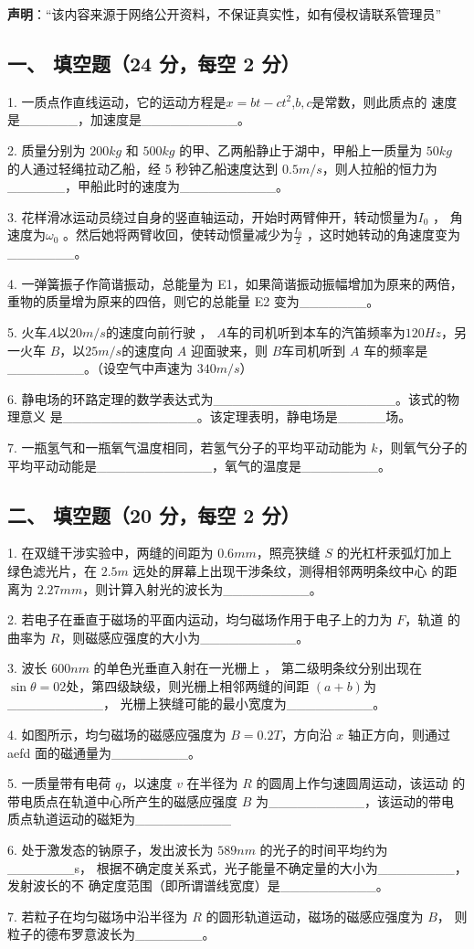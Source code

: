 
\textbf{声明}：“该内容来源于网络公开资料，不保证真实性，如有侵权请联系管理员”

\subsection{一、 填空题（24 分，每空 2 分）}
1. 一质点作直线运动，它的运动方程是$x=bt-ct^2$,$b,c$是常数，则此质点的
速度是______，加速度是__________。

2. 质量分别为 $200kg$ 和 $500kg$ 的甲、乙两船静止于湖中，甲船上一质量为 $50kg$
的人通过轻绳拉动乙船，经 5 秒钟乙船速度达到 $0.5m/s$，则人拉船的恒力为
______，甲船此时的速度为__________。

3. 花样滑冰运动员绕过自身的竖直轴运动，开始时两臂伸开，转动惯量为$I_0$ ，
角速度为$\omega_0$ 。然后她将两臂收回，使转动惯量减少为$\frac{I_0}{2}$ ，这时她转动的角速度变为_______。

4. 一弹簧振子作简谐振动，总能量为 E1，如果简谐振动振幅增加为原来的两倍，
重物的质量增为原来的四倍，则它的总能量 E2 变为_______。

5. 火车$A$以$20m/s$的速度向前行驶 ， $A$车的司机听到本车的汽笛频率为$120Hz$，另一火车 $B$，以$25m/s$的速度向 $A$ 迎面驶来，则 $B$车司机听到 $A$ 车的频率是 ________。（设空气中声速为 3$40m/s$）

6. 静电场的环路定理的数学表达式为___________________。该式的物理意义
是______________。该定理表明，静电场是_____场。

7. 一瓶氢气和一瓶氧气温度相同，若氢气分子的平均平动动能为 $k$，则氧气分子的平均平动动能是____________，氧气的温度是________。
\subsection{二、 填空题（20 分，每空 2 分）}
1. 在双缝干涉实验中，两缝的间距为 $0.6mm$，照亮狭缝 $S$ 的光杠杆汞弧灯加上
绿色滤光片，在 $2.5m$ 远处的屏幕上出现干涉条纹，测得相邻两明条纹中心
的距离为 $2.27mm$，则计算入射光的波长为_________。

2. 若电子在垂直于磁场的平面内运动，均匀磁场作用于电子上的力为 $F$，轨道
的曲率为 $R$，则磁感应强度的大小为__________。

3. 波长 $600nm$ 的单色光垂直入射在一光栅上 ， 第二级明条纹分别出现在$\sin\theta=02$处，第四级缺级，则光栅上相邻两缝的间距 $(a+b)$为__________，
光栅上狭缝可能的最小宽度为_________。

4. 如图所示，均匀磁场的磁感应强度为 $B=0.2T$，方向沿 $x$ 轴正方向，则通过
aefd 面的磁通量为________。

5. 一质量带有电荷 $q$，以速度 $v$ 在半径为 $R$ 的圆周上作匀速圆周运动，该运动
的带电质点在轨道中心所产生的磁感应强度 $B$ 为__________，该运动的带电
质点轨道运动的磁矩为__________

6. 处于激发态的钠原子，发出波长为 $589nm$ 的光子的时间平均约为_______s，
根据不确定度关系式，光子能量不确定量的大小为________，发射波长的不
确定度范围（即所谓谱线宽度）是__________。

7. 若粒子在均匀磁场中沿半径为 $R$ 的圆形轨道运动，磁场的磁感应强度为 $B$，
则粒子的德布罗意波长为_______。